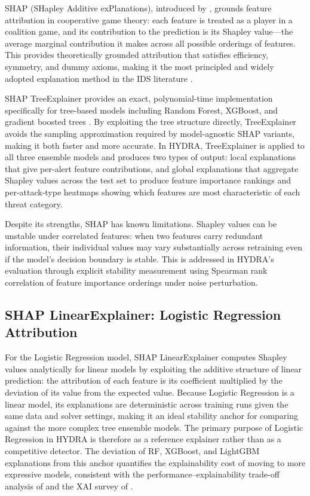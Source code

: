 \documentclass[12pt,a4paper]{report}
\begin{document}
SHAP (SHapley Additive exPlanations), introduced by \citet{lundberg2017}, grounds feature attribution in cooperative game theory: each feature is treated as a player in a coalition game, and its contribution to the prediction is its Shapley value---the average marginal contribution it makes across all possible orderings of features. This provides theoretically grounded attribution that satisfies efficiency, symmetry, and dummy axioms, making it the most principled and widely adopted explanation method in the IDS literature \citep{lundberg2022}.

SHAP TreeExplainer provides an exact, polynomial-time implementation specifically for tree-based models including Random Forest, XGBoost, and gradient boosted trees \citep{lundberg2020}. By exploiting the tree structure directly, TreeExplainer avoids the sampling approximation required by model-agnostic SHAP variants, making it both faster and more accurate. In HYDRA, TreeExplainer is applied to all three ensemble models and produces two types of output: local explanations that give per-alert feature contributions, and global explanations that aggregate Shapley values across the test set to produce feature importance rankings and per-attack-type heatmaps showing which features are most characteristic of each threat category.

Despite its strengths, SHAP has known limitations. Shapley values can be unstable under correlated features: when two features carry redundant information, their individual values may vary substantially across retraining even if the model's decision boundary is stable. This is addressed in HYDRA's evaluation through explicit stability measurement using Spearman rank correlation of feature importance orderings under noise perturbation.

\subsection{SHAP LinearExplainer: Logistic Regression Attribution}
\label{sec:shap-linear}

For the Logistic Regression model, SHAP LinearExplainer computes Shapley values analytically for linear models by exploiting the additive structure of linear prediction: the attribution of each feature is its coefficient multiplied by the deviation of its value from the expected value. Because Logistic Regression is a linear model, its explanations are deterministic across training runs given the same data and solver settings, making it an ideal stability anchor for comparing against the more complex tree ensemble models. The primary purpose of Logistic Regression in HYDRA is therefore as a reference explainer rather than as a competitive detector. The deviation of RF, XGBoost, and LightGBM explanations from this anchor quantifies the explainability cost of moving to more expressive models, consistent with the performance--explainability trade-off analysis of \citet{bhatt2020} and the XAI survey of \citet{adadi2018}.
\end{document}
